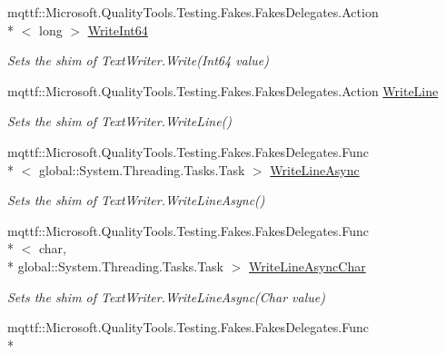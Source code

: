 \begin{DoxyCompactItemize}
mqttf\-::\-Microsoft.\-Quality\-Tools.\-Testing.\-Fakes.\-Fakes\-Delegates.\-Action\\*
$<$ long $>$ \hyperlink{class_system_1_1_i_o_1_1_fakes_1_1_shim_text_writer_a6c1ae3c01c0e7ffbbaef7987d6c8ee6e}{Write\-Int64}
\begin{DoxyCompactList}\small\item\em Sets the shim of Text\-Writer.\-Write(\-Int64 value)\end{DoxyCompactList}\item 
mqttf\-::\-Microsoft.\-Quality\-Tools.\-Testing.\-Fakes.\-Fakes\-Delegates.\-Action \hyperlink{class_system_1_1_i_o_1_1_fakes_1_1_shim_text_writer_a780191221728ef4adcb9a5acc4aca638}{Write\-Line}
\begin{DoxyCompactList}\small\item\em Sets the shim of Text\-Writer.\-Write\-Line()\end{DoxyCompactList}\item 
mqttf\-::\-Microsoft.\-Quality\-Tools.\-Testing.\-Fakes.\-Fakes\-Delegates.\-Func\\*
$<$ global\-::\-System.\-Threading.\-Tasks.\-Task $>$ \hyperlink{class_system_1_1_i_o_1_1_fakes_1_1_shim_text_writer_a7a06c9601092618f87bf21f3b7df7397}{Write\-Line\-Async}
\begin{DoxyCompactList}\small\item\em Sets the shim of Text\-Writer.\-Write\-Line\-Async()\end{DoxyCompactList}\item 
mqttf\-::\-Microsoft.\-Quality\-Tools.\-Testing.\-Fakes.\-Fakes\-Delegates.\-Func\\*
$<$ char, \\*
global\-::\-System.\-Threading.\-Tasks.\-Task $>$ \hyperlink{class_system_1_1_i_o_1_1_fakes_1_1_shim_text_writer_a7eb66fa9a4f6fe64e5e2349c854231f6}{Write\-Line\-Async\-Char}
\begin{DoxyCompactList}\small\item\em Sets the shim of Text\-Writer.\-Write\-Line\-Async(\-Char value)\end{DoxyCompactList}\item 
mqttf\-::\-Microsoft.\-Quality\-Tools.\-Testing.\-Fakes.\-Fakes\-Delegates.\-Func\\*

\end{DoxyCompactItemize}
